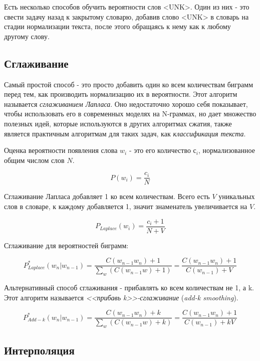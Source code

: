 \documentclass[a4paper,12pt,preview]{report} %
\begin{document}
	Есть несколько способов обучить вероятности слов <UNK>. Один из них - это свести задачу назад к закрытому словарю, добавив слово <UNK> в словарь на стадии нормализации текста, после этого обращаясь к нему как к любому другому слову.
	
	\subsection{Сглаживание}
	Самый простой способ - это просто добавить один ко всем количествам биграмм перед тем, как производить нормализацию их в вероятности. Этот алгоритм называется \textit{сглаживанием Лапласа}. Оно недостаточно хорошо себя показывает, чтобы использовать его в современных моделях на N-граммах, но дает множество полезных идей, которые используются в других алгоритмах сжатия, также является практичным алгоритмам для таких задач, как \textit{классификация текста}.
	
	Оценка вероятности появления слова $w_i$ - это его количество $с_i$, нормализованное общим числом слов $N$.
	
	\begin{equation}
		P(w_i) = \dfrac{c_i}{N}
	\end{equation}
	
	Сглаживание Лапласа добавляет 1 ко всем количествам. Всего есть $V$ уникальных слов в словаре, к каждому добавляется 1, значит знаменатель увеличивается на $V$.
	
	\begin{equation}
		P_{Laplace}(w_i) = \dfrac{c_i + 1}{N + V}
	\end{equation}
	
	
	Сглаживание для вероятностей биграмм:
	
	\begin{equation}
		P^{*}_{Laplace}(w_n | w_{n-1}) = \dfrac{C(w_{n-1} w_n) + 1}{\sum_w (C(w_{n-1} w) + 1)} = \dfrac{C(w_{n-1} w_n) + 1}{C(w_{n-1}) + V}
	\end{equation}
	
	Альтернативный способ сглаживания - прибавлять ко всем количествам не 1, а k. Этот алгоритм называется \textit{<<прибавь k>>-сглаживание} (\textit{add-k smoothing}).
	
	\begin{equation}
		P^{*}_{Add-k}(w_n | w_{n-1}) = \dfrac{C(w_{n-1} w_n) + k}{\sum_w (C(w_{n-1} w) + k)} = \dfrac{C(w_{n-1} w_n) + 1}{C(w_{n-1}) + kV}
	\end{equation}
	 
	 \subsection{Интерполяция}
	 
\end{document}
